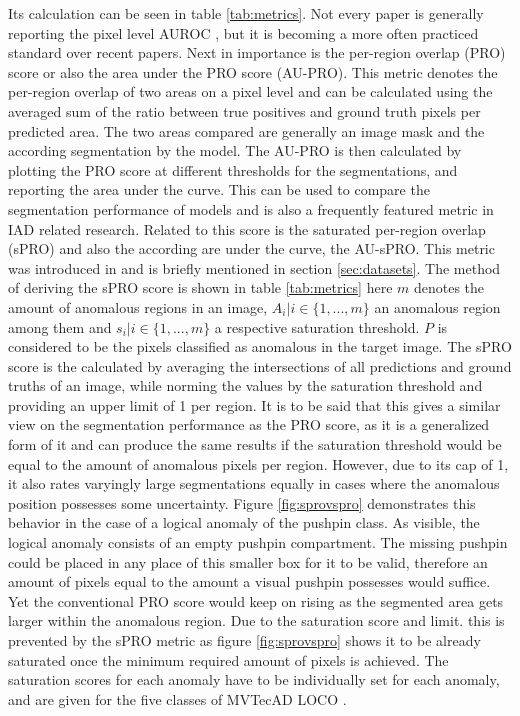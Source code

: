 

Its calculation can be seen in 
table \ref{tab:metrics}. Not every paper is generally reporting the pixel level AUROC \cite{csflow2022}, but it is becoming a more often 
practiced standard over recent papers.
Next in importance is the per-region overlap (PRO) score or also the area under the PRO score (AU-PRO). This metric denotes the per-region overlap of two areas 
on a pixel level and can be calculated using the averaged sum of the ratio between true positives and ground truth pixels per predicted area. The two areas 
compared are generally an image mask and the according segmentation by the model. The AU-PRO is then calculated by plotting the PRO score 
at different thresholds for the segmentations, and reporting the area under the curve. This can be 
used to compare the segmentation performance of models and is also a frequently featured metric in IAD related research. 
Related to this score is the saturated per-region overlap (sPRO) and also the according are under the curve, the AU-sPRO. This metric was 
introduced in \cite{LOCODentsAndScratchesBergmann2022} and is briefly mentioned in section \ref{sec:datasets}. The method of deriving the sPRO 
score is shown in table \ref{tab:metrics} here $m$ denotes the amount of anomalous regions in an image, $A_i | i \in \{1, ... , m\}$ an anomalous 
region among them and $s_i | i \in \{1, ... , m\}$ a respective saturation threshold. $P$ is considered to be the pixels classified as anomalous 
in the target image. The sPRO score is the calculated by averaging the intersections of all predictions and ground truths of an image, 
while norming the values by the saturation threshold and providing an upper limit of 1 per region. It is to be said that this gives a similar 
view on the segmentation performance as the PRO score, as it is a generalized form of it and can produce the same results if the saturation 
threshold would be equal to the amount of anomalous pixels per region. However, due to its cap of 1, it also rates varyingly large segmentations equally in cases 
where the anomalous position possesses some uncertainty. Figure \ref{fig:sprovspro} demonstrates this behavior in the case of a logical anomaly of the pushpin class. 
As visible, the logical anomaly consists of an empty pushpin compartment. The missing pushpin could be placed in any place of this smaller 
box for it to be valid, therefore an amount of pixels equal to the amount a visual pushpin possesses would suffice. Yet the conventional PRO score 
would keep on rising as the segmented area gets larger within the anomalous region. Due to the saturation score and limit. this is prevented 
by the sPRO metric as figure \ref{fig:sprovspro} shows it to be already saturated once the minimum required amount of pixels is achieved. The saturation 
scores for each anomaly have to be individually set for each anomaly, and are given for the five classes of MVTecAD LOCO \cite{LOCODentsAndScratchesBergmann2022}.

